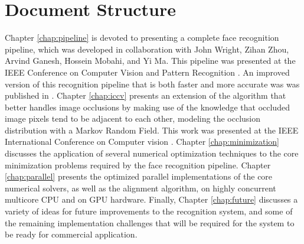 \section{Document Structure}
%
Chapter \ref{chap:pipeline} is devoted to presenting a complete face
recognition pipeline, which was developed in collaboration with John Wright,
Zihan Zhou, Arvind Ganesh, Hossein Mobahi, and Yi Ma.  This pipeline was
presented at the IEEE Conference on Computer Vision and Pattern Recognition
\cite{WagnerA2009-CVPR}.  An improved version of this recognition pipeline that
is both faster and more accurate was was published in \cite{WagnerA2011-PAMI}.
%
Chapter \ref{chap:iccv} presents an extension of the algorithm that better
handles image occlusions by making use of the knowledge that occluded image
pixels tend to be adjacent to each other, modeling the occlusion distribution
with a Markov Random Field.  This work was presented at the IEEE International
Conference on Computer vision \cite{ZhouZ2009}.
%
Chapter \ref{chap:minimization} discusses the application of several numerical
optimization techniques to the core minimization problems required by the face
recognition pipeline.
%
Chapter \ref{chap:parallel} presents the optimized parallel implementations of
the core numerical solvers, as well as the alignment algorithm, on highly
concurrent multicore CPU and on GPU hardware.
%
Finally, Chapter \ref{chap:future} discusses a variety of ideas for future
improvements to the recognition system, and some of the remaining
implementation challenges that will be required for the system to be ready for
commercial application.
 
